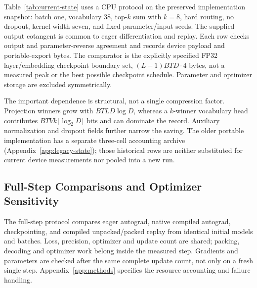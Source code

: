 \documentclass{article}
\theoremstyle{plain}
\theoremstyle{definition}
\theoremstyle{remark}
\begin{document}
Table~\ref{tab:current-state} uses a CPU protocol on the preserved
implementation snapshot: batch one, vocabulary 38, top-$k$ sum with $k=8$, hard routing,
no dropout, kernel width seven, and fixed parameter/input seeds. The supplied output cotangent
is common to eager differentiation and replay. Each row checks output and
parameter-reverse agreement and records device payload and portable-export
bytes. The comparator is the explicitly specified FP32 layer/embedding
checkpoint boundary set, $(L+1)BTD\cdot4$ bytes, not a measured peak or the
best possible checkpoint schedule. Parameter and optimizer storage are
excluded symmetrically.

\begin{table}[t]
\centering
\caption{Source-snapshotted retained-state audit. Payload is actual device-tape
storage; portable includes export framing. ``Boundary B'' is the specified
layer/embedding checkpoint retained set; Ratio is Boundary B / Packed B.
Both use a common supplied-cotangent boundary, not
allocator peak or an optimal schedule. Ratios do not include recomputation,
traffic, transient workspace, loss construction or optimizer state.
Exact source and configuration fingerprints accompany every row.}
\label{tab:current-state}
\small

\end{table}

The important dependence is structural, not a single compression factor.
Projection winners grow with $BTLD\log D$, whereas a $k$-winner vocabulary
head contributes $BTVk\lceil\log_2D\rceil$ bits and can dominate the record.
Auxiliary normalization and dropout fields further narrow the saving.
The older portable implementation has a separate three-cell accounting
archive (Appendix~\ref{app:legacy-state}); those historical rows are neither
substituted for current device measurements nor pooled into a new run.

\subsection{Full-Step Comparisons and Optimizer Sensitivity}

The full-step protocol compares eager autograd, native compiled autograd,
checkpointing, and compiled unpacked/packed replay from identical initial
models and batches. Loss, precision, optimizer and update count are shared;
packing, decoding and optimizer work belong inside the measured step.
Gradients and parameters are checked after the same complete update count,
not only on a fresh single step. Appendix~\ref{app:methods} specifies the
resource accounting and failure handling.
\end{document}
